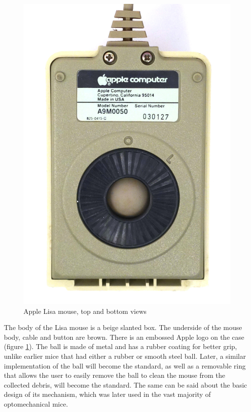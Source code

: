 \documentclass[11pt, a4paper]{article}
\begin{document}
\begin{figure}[h]
    \includegraphics[scale=0.55]{1983_apple_lisa_mouse/applebottom_60.jpg}
    \caption{Apple Lisa mouse, top and bottom views}
    \label{fig:AppleLisaTopAndBottom}
\end{figure}

The body of the Lisa mouse is a beige slanted box. The underside of the mouse body, cable and button are brown. There is an embossed Apple logo on the case (figure \ref{fig:AppleLisaTopAndBottom}). The ball is made of metal and has a rubber coating for better grip, unlike earlier mice that had either a rubber or smooth steel ball. Later, a similar implementation of the ball will become the standard, as well as a removable ring that allows the user to easily remove the ball to clean the mouse from the collected debris, will become the standard. The same can be said about the basic design of its mechanism, which was later used in the vast majority of optomechanical mice.
\end{document}

